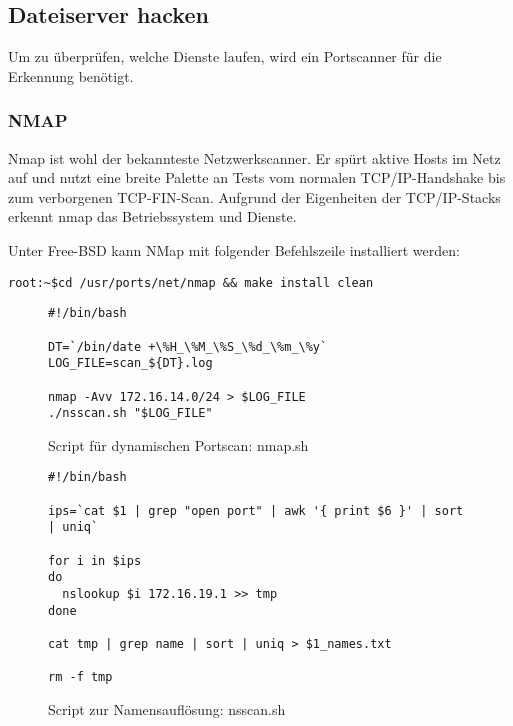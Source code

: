 \subsection{Dateiserver hacken}
\label{sec:dateiserverhacken}

%
%
%
%
%

Um zu überprüfen, welche Dienste laufen, wird ein Portscanner für die Erkennung
benötigt.

\subsubsection{NMAP}

Nmap ist wohl der bekannteste Netzwerkscanner. Er spürt aktive Hosts im Netz auf
und nutzt eine breite Palette an Tests vom normalen TCP/IP-Handshake bis zum
verborgenen TCP-FIN-Scan. Aufgrund der Eigenheiten der TCP/IP-Stacks erkennt
nmap das Betriebssystem und Dienste.

Unter Free-BSD kann NMap mit folgender Befehlszeile installiert werden:

\begin{verbatim}
root:~$cd /usr/ports/net/nmap && make install clean
\end{verbatim}

\begin{figure}
\begin{lstlisting}
#!/bin/bash

DT=`/bin/date +\%H_\%M_\%S_\%d_\%m_\%y`
LOG_FILE=scan_${DT}.log

nmap -Avv 172.16.14.0/24 > $LOG_FILE
./nsscan.sh "$LOG_FILE"

\end{lstlisting}
\caption{Script für dynamischen Portscan: nmap.sh}
\end{figure}

\begin{figure}
\begin{lstlisting}
#!/bin/bash

ips=`cat $1 | grep "open port" | awk '{ print $6 }' | sort | uniq`

for i in $ips 
do
  nslookup $i 172.16.19.1 >> tmp 
done

cat tmp | grep name | sort | uniq > $1_names.txt

rm -f tmp
\end{lstlisting}
\caption{Script zur Namensauflösung: nsscan.sh}
\end{figure}

